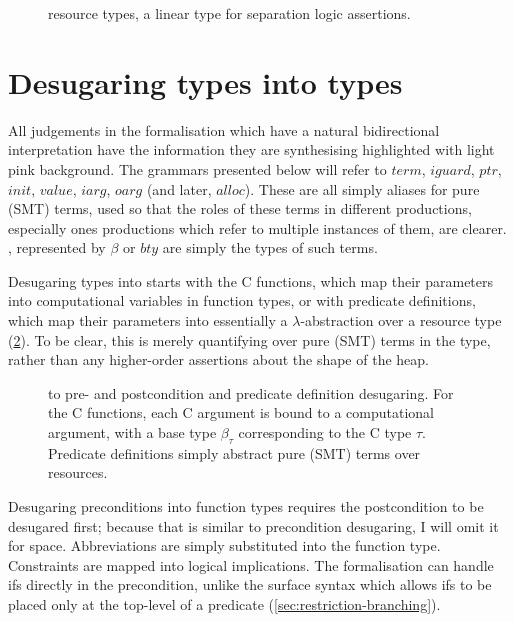 \begin{figure}
    \small
    \grammartabularSTY{%
        \cnres{}
    }
    \caption{ resource types, a linear type for separation logic
        assertions.}\label{fig:kernel-res}
\end{figure}

\section{Desugaring  types into  types}\label{sec:desugaring}

All judgements in the formalisation which have a natural bidirectional
interpretation have the information they are synthesising highlighted with
\colorbox{pink!30}{light pink} background. The grammars presented below will
refer to ${term}$, ${iguard}$, ${ptr}$, ${init}$, ${value}$, ${iarg}$, ${oarg}$
(and later, ${alloc}$). These are all simply aliases for pure (SMT) terms, used
so that the roles of these terms in different productions, especially ones
productions which refer to multiple instances of them, are clearer. , represented by $\beta$ or ${bty}$ are simply the types of such terms.

Desugaring  types into  starts with the C functions, which
map their parameters into computational variables in function types, or with
predicate definitions, which map their parameters into essentially a
$\lambda$-abstraction over a resource type (\cref{fig:prepost-to-kernel}). To
be clear, this is merely quantifying over pure (SMT) terms in the type, rather
than any higher-order assertions about the shape of the heap.

\begin{figure}[tp]
    \small
    \raggedright{}
    \cndefnSpecXXUserDef{}
    \cndefnSpecXXPredDef{}
    \caption{ to  pre- and postcondition and predicate
        definition desugaring. For the C functions, each C argument is bound to
        a computational argument, with a base type $\beta_\tau$ corresponding
        to the C type $\tau$. Predicate definitions simply abstract pure (SMT)
        terms over resources.}\label{fig:prepost-to-kernel}
\end{figure}

Desugaring preconditions into function types requires the postcondition to be
desugared first; because that is similar to precondition desugaring, I will
omit it for space. Abbreviations are simply substituted into the function
type.\label{sn:abbrev}
Constraints are mapped into logical implications. The formalisation can handle
ifs directly in the precondition, unlike the surface syntax which allows ifs to be placed
only at the top-level of a predicate (\cref{sec:restriction-branching}).


